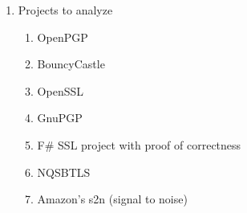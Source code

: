 \documentclass[letterpaper,twocolumn,10pt]{article}
\begin{document}
\begin{enumerate}
\begin{enumerate}
		\end{enumerate}
	\item Projects to analyze 
		\begin{enumerate}
			\item OpenPGP
			\item BouncyCastle
			\item OpenSSL
			\item GnuPGP
			\item F\# SSL project with proof of correctness
			\item NQSBTLS
			\item Amazon's s2n (signal to noise)
		\end{enumerate}
\end{enumerate}

{\normalsize 
}



\end{document}
